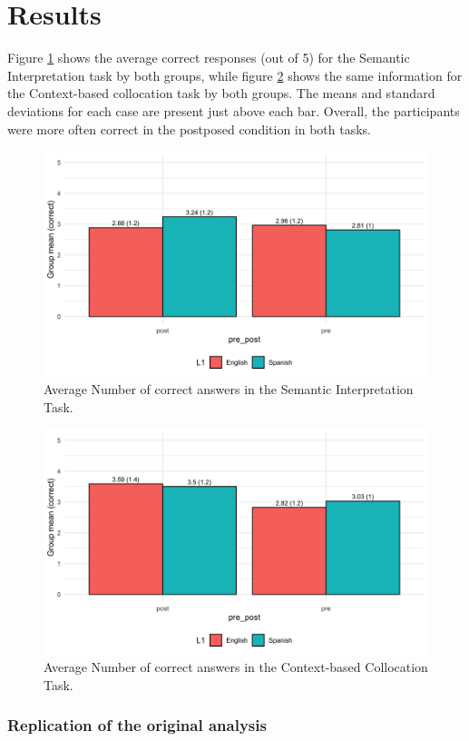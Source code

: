 \documentclass[
  man,floatsintext]{apa6}
\begin{document}
\hypertarget{results}{%
\section{Results}\label{results}}

Figure \ref{fig:sem-desc} shows the average correct responses (out of 5) for the Semantic Interpretation task by both groups, while figure \ref{fig:cmc-desc} shows the same information for the Context-based collocation task by both groups.
The means and standard deviations for each case are present just above each bar.
Overall, the participants were more often correct in the postposed condition in both tasks.

\begin{figure}
\includegraphics[width=425px]{figs/semantic_desc} \caption{Average Number of correct answers in the Semantic Interpretation Task.}\label{fig:sem-desc}
\end{figure}

\begin{figure}
\includegraphics[width=425px]{figs/cbc_desc} \caption{Average Number of correct answers in the Context-based Collocation Task.}\label{fig:cmc-desc}
\end{figure}

\hypertarget{replication-of-the-original-analysis}{%
\subsubsection{Replication of the original analysis}\label{replication-of-the-original-analysis}}
\end{document}
